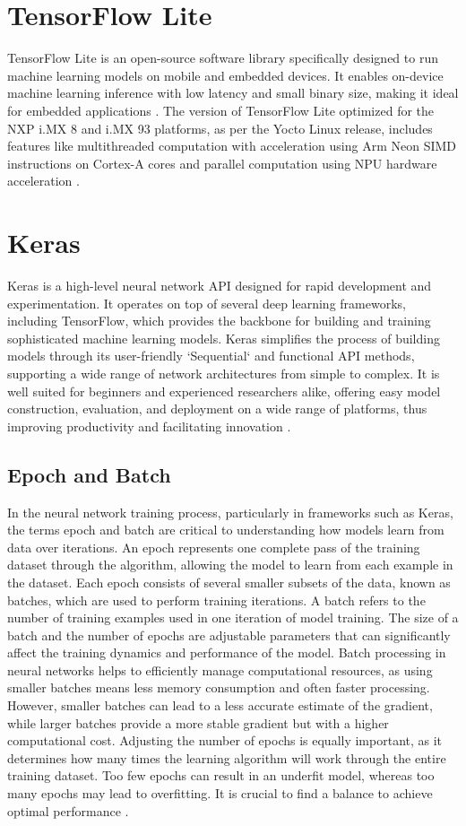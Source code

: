 \section{TensorFlow Lite}
TensorFlow Lite is an open-source software library specifically designed to run machine learning models on mobile and embedded devices. \cite{tensorflow2015-whitepaper} It enables on-device machine learning inference with low latency and small binary size, making it ideal for embedded applications \cite{iMX_MACHINE_LEARNING_UG}. The version of TensorFlow Lite optimized for the NXP i.MX 8 and i.MX 93 platforms, as per the Yocto Linux release, includes features like multithreaded computation with acceleration using Arm Neon SIMD instructions on Cortex-A cores and parallel computation using NPU hardware acceleration \cite{iMX_MACHINE_LEARNING_UG}.

\section{Keras}
Keras is a high-level neural network API designed for rapid development and experimentation. It operates on top of several deep learning frameworks, including TensorFlow, which provides the backbone for building and training sophisticated machine learning models. Keras simplifies the process of building models through its user-friendly `Sequential` and functional API methods, supporting a wide range of network architectures from simple to complex. It is well suited for beginners and experienced researchers alike, offering easy model construction, evaluation, and deployment on a wide range of platforms, thus improving productivity and facilitating innovation \cite{chollet2015keras}.

\subsection{Epoch and Batch}
In the neural network training process, particularly in frameworks such as Keras, the terms epoch and batch are critical to understanding how models learn from data over iterations. An epoch represents one complete pass of the training dataset through the algorithm, allowing the model to learn from each example in the dataset. Each epoch consists of several smaller subsets of the data, known as batches, which are used to perform training iterations. A batch refers to the number of training examples used in one iteration of model training. The size of a batch and the number of epochs are adjustable parameters that can significantly affect the training dynamics and performance of the model. Batch processing in neural networks helps to efficiently manage computational resources, as using smaller batches means less memory consumption and often faster processing. However, smaller batches can lead to a less accurate estimate of the gradient, while larger batches provide a more stable gradient but with a higher computational cost. Adjusting the number of epochs is equally important, as it determines how many times the learning algorithm will work through the entire training dataset. Too few epochs can result in an underfit model, whereas too many epochs may lead to overfitting. It is crucial to find a balance to achieve optimal performance \cite{aldin2022accuracy}.


